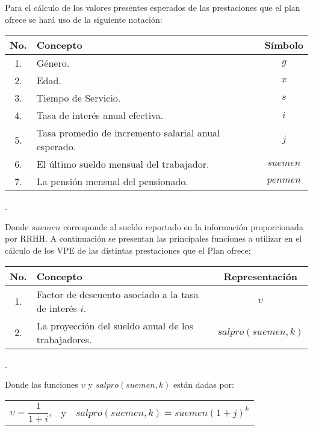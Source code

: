 \documentclass[12pt,letterpaper,titlepage]{article}
\begin{document}
{Para el cálculo de los valores presentes esperados de las prestaciones que el plan ofrece se hará uso de la siguiente notación:\\
\begin{center} 
	\begin{tabular}{|c||l||c|}
		\hline 
		\rule[-1ex]{0pt}{2.5ex} No. & Concepto & Símbolo \\  
		\hline 
		\hline
		\rule[-1ex]{0pt}{2.5ex} 1. &Género. & $g$ \\ 
		\hline 
		\rule[-1ex]{0pt}{2.5ex} 2. & Edad. & $x$ \\ 
		\hline 
		\rule[-1ex]{0pt}{2.5ex} 3. & Tiempo de Servicio. & $s$ \\ 
		\hline 
		\rule[-1ex]{0pt}{2.5ex} 4. & Tasa de interés anual efectiva. & $i$ \\ 
		\hline 
		\rule[-1ex]{0pt}{2.5ex} 5. & Tasa promedio de incremento salarial anual esperado. & $j$ \\ 
		\hline 
		\rule[-1ex]{0pt}{2.5ex} 6. & El último sueldo mensual del trabajador. & $suemen$ \\ 
		\hline 
		\rule[-1ex]{0pt}{2.5ex} 7. & La pensión mensual del pensionado. & $penmen$ \\ 
		\hline 
	\end{tabular} 
\end{center}.

Donde $suemen$ corresponde al sueldo reportado en la información proporcionada por RRHH. A continuación se presentan las principales funciones a utilizar en el cálculo de los VPE de las distintas prestaciones que el Plan ofrece: \\

\begin{center}
	\begin{tabular}{|c||l||c|} %
		\hline 
		\rule[-1ex]{0pt}{2.5ex} No. & Concepto & Representación \\ 
		\hline 
		\hline 
		\rule[-1ex]{0pt}{2.5ex} 1. & Factor de descuento asociado a la tasa de interés $i$. & $\upsilon$ \\ 
		\hline 
		\rule[-1ex]{0pt}{2.5ex} 2. & La proyección del sueldo anual de los trabajadores. & $salpro(suemen,k)$ \\ 
		\hline 
	\end{tabular} 
\end{center}.

Donde las funciones  $\upsilon$ y $salpro(suemen,k)$ están dadas por:\\

\begin{center}
	\begin{tabular}{ccc}
		$\upsilon = \dfrac{1}{1+i}$, & y & $salpro(suemen,k)=suemen(1+j)^{k}$
	\end{tabular} 
\end{center} 

}
\end{document}
